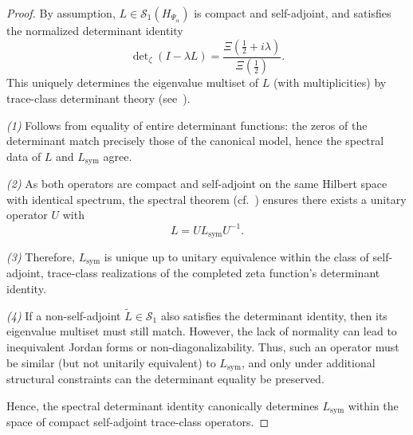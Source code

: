 \begin{proof}
By assumption, \( L \in \mathcal{S}_1(H_{\Psi_\alpha}) \) is compact and self-adjoint, and satisfies the normalized determinant identity
\[
\det\nolimits_\zeta(I - \lambda L) = \frac{\Xi\left(\tfrac{1}{2} + i\lambda\right)}{\Xi\left(\tfrac{1}{2}\right)}.
\]
This uniquely determines the eigenvalue multiset of \( L \) (with multiplicities) by trace-class determinant theory (see~\cite[Theorem~4.2]{Simon2005TraceIdeals}).

\smallskip

\textit{(1)} Follows from equality of entire determinant functions: the zeros of the determinant match precisely those of the canonical model, hence the spectral data of \( L \) and \( L_{\mathrm{sym}} \) agree.

\smallskip

\textit{(2)} As both operators are compact and self-adjoint on the same Hilbert space with identical spectrum, the spectral theorem (cf.~\cite[Theorem~VI.16]{ReedSimon1980I}) ensures there exists a unitary operator \( U \) with
\[
L = U L_{\mathrm{sym}} U^{-1}.
\]

\smallskip

\textit{(3)} Therefore, \( L_{\mathrm{sym}} \) is unique up to unitary equivalence within the class of self-adjoint, trace-class realizations of the completed zeta function's determinant identity.

\smallskip

\textit{(4)} If a non-self-adjoint \( \tilde{L} \in \mathcal{S}_1 \) also satisfies the determinant identity, then its eigenvalue multiset must still match. However, the lack of normality can lead to inequivalent Jordan forms or non-diagonalizability. Thus, such an operator must be similar (but not unitarily equivalent) to \( L_{\mathrm{sym}} \), and only under additional structural constraints can the determinant equality be preserved.

\smallskip

Hence, the spectral determinant identity canonically determines \( L_{\mathrm{sym}} \) within the space of compact self-adjoint trace-class operators.
\end{proof}
%  